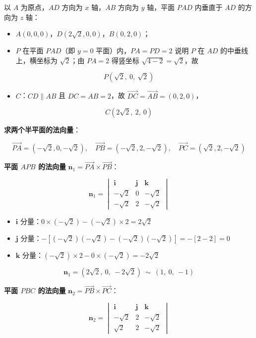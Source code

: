 \begin{answer}
以 $A$ 为原点，$AD$ 方向为 $x$ 轴，$AB$ 方向为 $y$ 轴，平面 $PAD$ 内垂直于 $AD$ 的方向为 $z$ 轴：

\begin{itemize}
\item $A(0,0,0)$，$D\left(2\sqrt2,0,0\right)$，$B(0,2,0)$；
\item $P$ 在平面 $PAD$（即 $y=0$ 平面）内，$PA=PD=2$ 说明 $P$ 在 $AD$ 的中垂线上，横坐标为 $\sqrt2$；由 $PA=2$ 得竖坐标 $\sqrt{4-2}=\sqrt2$，故
\end{itemize}
\nopagebreak[4]
\[P\left(\sqrt2,\ 0,\ \sqrt2\right)\]
\begin{itemize}
\item $C$：$CD\parallel AB$ 且 $DC=AB=2$，故 $\overrightarrow{DC}=\overrightarrow{AB}=(0,2,0)$，
\end{itemize}
\nopagebreak[4]
\[C\left(2\sqrt2,\ 2,\ 0\right)\]

\textbf{求两个半平面的法向量}：

\nopagebreak[4]
\[\overrightarrow{PA}=\left(-\sqrt2,0,-\sqrt2\right),\quad \overrightarrow{PB}=\left(-\sqrt2,2,-\sqrt2\right),\quad \overrightarrow{PC}=\left(\sqrt2,2,-\sqrt2\right)\]

\textbf{平面 $APB$ 的法向量} $\boldsymbol n_1=\overrightarrow{PA}\times\overrightarrow{PB}$：

\nopagebreak[4]
\[\boldsymbol n_1=\begin{vmatrix}\boldsymbol i&\boldsymbol j&\boldsymbol k\\-\sqrt2&0&-\sqrt2\\-\sqrt2&2&-\sqrt2\end{vmatrix}\]

\begin{itemize}
\item $\boldsymbol i$ 分量：$0\times(-\sqrt2)-(-\sqrt2)\times2=2\sqrt2$
\item $\boldsymbol j$ 分量：$-\left[(-\sqrt2)(-\sqrt2)-(-\sqrt2)(-\sqrt2)\right]=-[2-2]=0$
\item $\boldsymbol k$ 分量：$(-\sqrt2)\times2-0\times(-\sqrt2)=-2\sqrt2$
\end{itemize}

\nopagebreak[4]
\[\boldsymbol n_1=\left(2\sqrt2,\ 0,\ -2\sqrt2\right)\ \sim\ (1,\ 0,\ -1)\]

\textbf{平面 $PBC$ 的法向量} $\boldsymbol n_2=\overrightarrow{PB}\times\overrightarrow{PC}$：

\nopagebreak[4]
\[\boldsymbol n_2=\begin{vmatrix}\boldsymbol i&\boldsymbol j&\boldsymbol k\\-\sqrt2&2&-\sqrt2\\ \sqrt2&2&-\sqrt2\end{vmatrix}\]


\end{answer}

